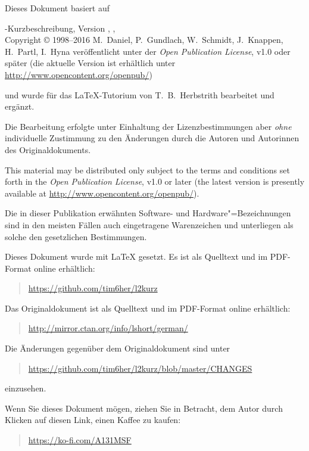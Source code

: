 {\parindent=0cm\thispagestyle{empty}

Dieses Dokument basiert auf
\bigskip

\sbLaTeXe-Kurzbeschreibung, Version \lkver, \lkdate,\\
Copyright \copyright{} 1998--2016 M.~Daniel, P.~Gundlach, W.~Schmidt, J.~Knappen, H.~Partl, I.~Hyna veröffentlicht unter der \emph{Open Publication License}, v1.0 oder später (die aktuelle Version ist erhältlich unter
\url{http://www.opencontent.org/openpub/})
\bigskip

und wurde für das \LaTeX-Tutorium von T.~B.~Herbstrith bearbeitet und ergänzt.

Die Bearbeitung erfolgte unter Einhaltung der Lizenzbestimmungen aber \emph{ohne} individuelle Zustimmung zu den Änderungen durch die Autoren und Autorinnen des Originaldokuments.
\bigskip

{
This material may be distributed only subject to the terms and
conditions set forth in the \emph{Open Publication License}, v1.0 or
later (the latest version is presently available at
\url{http://www.opencontent.org/openpub/}).}


\bigskip

Die in dieser Publikation erwähnten Software- und Hardware"=Bezeichnungen sind
in den meisten Fällen auch eingetragene Warenzeichen und unterliegen als
solche den gesetzlichen Bestimmungen.

\bigskip

\vfill

Dieses Dokument wurde mit \LaTeX{} gesetzt.
Es ist als Quelltext  und im 
PDF-Format online erhältlich:
\begin{quote}
\url{https://github.com/tim6her/l2kurz}
\end{quote}

\bigskip

Das Originaldokument ist als Quelltext und im PDF-Format online erhältlich:
\begin{quote}
\url{http://mirror.ctan.org/info/lshort/german/}
\end{quote}
Die Änderungen gegenüber dem Originaldokument sind unter
\begin{quote}
\url{https://github.com/tim6her/l2kurz/blob/master/CHANGES}
\end{quote}
einzusehen.

\bigskip

Wenn Sie dieses Dokument mögen, ziehen Sie in Betracht, dem Autor durch Klicken auf diesen Link, einen Kaffee zu kaufen:
\begin{quote}
\url{https://ko-fi.com/A131MSF}
\end{quote}
}

